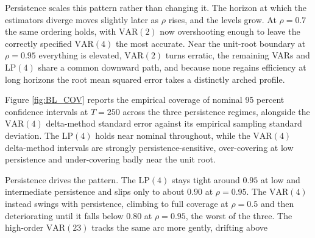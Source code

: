 Persistence scales this pattern rather than changing it. The horizon at which the estimators
diverge moves slightly later as $\rho$ rises, and the levels grow. At $\rho=0.7$ the same ordering
holds, with $\text{VAR}(2)$ now overshooting enough to leave the correctly specified
$\text{VAR}(4)$ the most accurate. Near the unit-root boundary at $\rho=0.95$ everything is
elevated, $\text{VAR}(2)$ turns erratic, the remaining VARs and $\text{LP}(4)$ share a common downward path, and because none regains efficiency at long horizons the root mean squared error takes a distinctly arched profile.

Figure \ref{fig:BL_COV} reports the empirical coverage of nominal 95 percent confidence intervals
at $T=250$ across the three persistence regimes, alongside the $\text{VAR}(4)$ delta-method
standard error against its empirical sampling standard deviation. The $\text{LP}(4)$ holds near
nominal throughout, while the $\text{VAR}(4)$ delta-method intervals are strongly
persistence-sensitive, over-covering at low persistence and under-covering badly near the unit
root.

Persistence drives the pattern. The $\text{LP}(4)$ stays tight around $0.95$ at low and
intermediate persistence and slips only to about $0.90$ at $\rho=0.95$. The $\text{VAR}(4)$
instead swings with persistence, climbing to full coverage at $\rho=0.5$ and then deteriorating
until it falls below $0.80$ at $\rho=0.95$, the worst of the three. The high-order $\text{VAR}(23)$
tracks the same arc more gently, drifting above 

